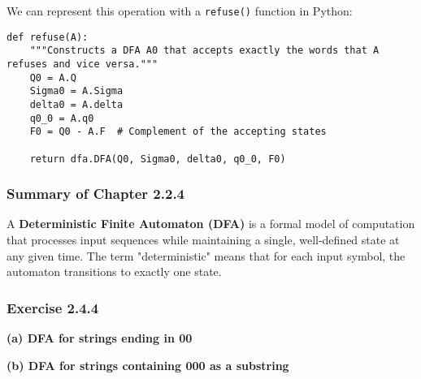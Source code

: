 \documentclass{article}
\theoremstyle{theorem}
\theoremstyle{definition}
\theoremstyle{remark}
\begin{document}
We can represent this operation with a \texttt{refuse()} function in Python:

\begin{verbatim}
def refuse(A):
    """Constructs a DFA A0 that accepts exactly the words that A refuses and vice versa."""
    Q0 = A.Q
    Sigma0 = A.Sigma
    delta0 = A.delta
    q0_0 = A.q0
    F0 = Q0 - A.F  # Complement of the accepting states

    return dfa.DFA(Q0, Sigma0, delta0, q0_0, F0)
\end{verbatim}

\subsubsection*{Summary of Chapter 2.2.4}
A \textbf{Deterministic Finite Automaton (DFA)} is a formal model of computation that processes input sequences while maintaining a single, well-defined state at any given time. The term "deterministic" means that for each input symbol, the automaton transitions to exactly one state.

\subsubsection*{Exercise 2.4.4}
\textbf{(a) DFA for strings ending in 00}

\begin{center}
\end{center}

\textbf{(b) DFA for strings containing 000 as a substring}

\begin{center}
\end{center}
\end{document}
